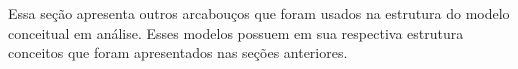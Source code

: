 Essa seção apresenta outros arcabouços que foram usados na estrutura do modelo conceitual em análise. Esses modelos possuem em sua respectiva estrutura conceitos que foram apresentados nas seções anteriores. 